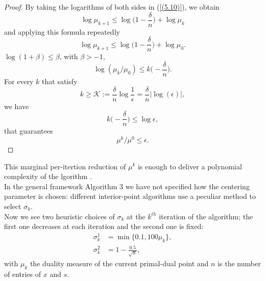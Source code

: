 \documentclass[a4paper,10 pt,titlepage,twoside]{book}
\theoremstyle{plain}
\theoremstyle{definition}
\theoremstyle{remark}
\begin{document}
\begin{proof}
	By taking the logarithms of both sides in (\ref{(5.10)}), we obtain
	\begin{equation*}
	\log\mu_{k+1}\leq \log \bigg(1-\frac{\delta}{n}\bigg)+\log\mu_{k}\end{equation*}
	and applying this formula repeatedly
	\begin{equation*}
	\log\mu_{k+1}\leq \log \bigg(1-\frac{\delta}{n}\bigg)+\log\mu_{0}.
	\end{equation*}
	 $\log(1+\beta)\leq\beta$, with $\beta>-1$,\\
	\begin{equation*}
	\log(\mu_{k}/\mu_{0})\leq k\bigg(-\frac{\delta}{n}\bigg).
	\end{equation*}	
	For every $k$ that satisfy
	\begin{equation*}
	k\geq\mathcal{K}:= \frac{\delta}{n}\log\frac{1}{\epsilon} = \frac{\delta}{n}|\log(\epsilon)|,
	\end{equation*}
	we have 
	\begin{equation*}
	k\bigg(-\frac{\delta}{n}\bigg)\leq\log\epsilon,
	\end{equation*}	
	that guarantees
	\begin{equation*}
	\mu^{k}/\mu^{0}\leq\epsilon.
	\end{equation*}	
\end{proof}
This marginal per-itertion reduction of $\mu^{k}$ is enough to deliver a polynomial complexity of the lgorithm \cite{25y}.\\
In the general framework Algorithm 3 we have not specified how the centering parameter is chosen: different interior-point algorithms use a peculiar method to select $\sigma_{k}$.\\
Now we see two heuristic choices of $\sigma_{k}$ at the $k^{th}$ iteration of the algorithm; the first one decreases at each iteration and the second one is fixed: 
\begin{align}
\sigma^{1}_{k} &= \min\{0.1, 100\mu_{k} \},\label{LPF1}\tag{4.13a}\\
\sigma^{2}_{k} &= 1 -\frac{0.5}{\sqrt{n}},\tag{4.13b}\label{LPF2}
\end{align}
with $\mu_{k}$ the duality measure of the current primal-dual point and $n$ is the number of entries of $x$ and $s$. 
\end{document}
